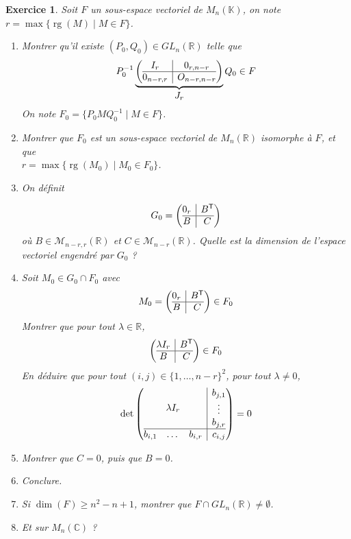 \documentclass[12pt]{article}
\newtheorem{exercise}{Exercice}[section]
\theoremstyle{remark}
\theoremstyle{remark}
\newcommand{\K}{\mathbb{K}} \newcommand{\R}{\mathbb{R}}
\newcommand{\C}{\mathbb{C}} \newcommand{\Q}{\mathbb{Q}}
\newcommand{\M}{\mathcal{M}} \renewcommand{\L}{\mathcal{L}}
\DeclareMathOperator{\rg}{rg} \DeclareMathOperator{\Tr}{Tr}
\begin{document}
\begin{exercise}
	Soit $F$ un sous-espace vectoriel de $M_{n}(\K)$, on note $r=\max\{\rg(M)\mid
	M\in F \}$.
	\begin{enumerate}
		\item
		Montrer qu'il existe $(P_{0},Q_{0})\in GL_{n}(\R)$ telle que 
		$$
		P_{0}^{-1}
		\underbrace{
			\left(
				\begin{array}{@{}c|c@{}}
					I_{r}
					& 0_{r,n-r} \\
					\hline
					0_{n-r,r} &
					O_{n-r,n-r}
				\end{array}\right)
		}_{\displaystyle J_{r}}
		Q_{0}\in F
		$$
		On note $F_{0}=\{P_{0}MQ_{0}^{-1}\mid M\in F\}$.
		\item
		Montrer que $F_{0}$ est un sous-espace vectoriel de $M_{n}(\R)$ isomorphe
		à $F$, et que \\$r=\max\{\rg(M_{0})\mid M_{0}\in F_{0}\}$.
		\item
		On définit
		
		$$G_{0}= \left(
				\begin{array}{@{}c|c@{}}
					0_{r}
					& B^{\mathsf{T}} \\
					\hline
					B & C \end{array}\right)
		$$
		où $B\in\M_{n-r,r}(\R)$ et $C\in\M_{n-r}(\R)$. 
		Quelle est la dimension de l'espace vectoriel engendré par $G_{0}$ ?
		\item Soit $M_{0}\in G_{0}\cap F_{0}$ avec 
		$$
			M_{0}= \left(
				\begin{array}{@{}c|c@{}}
					0_{r}
					& B^{\mathsf{T}} \\
					\hline
					B & C
				\end{array}
			\right)
			\in
			F_{0}
		$$
		Montrer que pour tout $\lambda\in\R$,
		$$
			\left(
				\begin{array}{@{}c|c@{}}
				\lambda
				I_{r} & B^{\mathsf{T}} \\
					\hline
					B & C
				\end{array}
			\right)
			\in
			F_{0}
		$$
		En déduire que pour tout $(i,j)\in\{1,\dots, n-r\}^{2}$, pour tout $\lambda\neq0$,
		$$
		\det\left(
				\begin{array}{@{}c|c@{}}
				\lambda
				I_{r} &
				\begin{matrix}
				b_{j,1}\\
						\vdots\\
						b_{j,r}
						\end{matrix}
						\\
					\hline
					\begin{matrix}
						b_{i,1} &
						\dots
						& b_{i,r}
						\end{matrix}
						& c_{i,j}
				\end{array}
			\right)=0
		$$
		\item Montrer que $C=0$, puis que $B=0$.
		\item Conclure.
		\item Si $\dim(F)\geqslant n^{2}-n+1$, montrer que $F\cap GL_{n}(\R)\neq\emptyset$.
		\item Et sur $M_{n}(\C)$ ?
	\end{enumerate}
\end{exercise}
\end{document}
